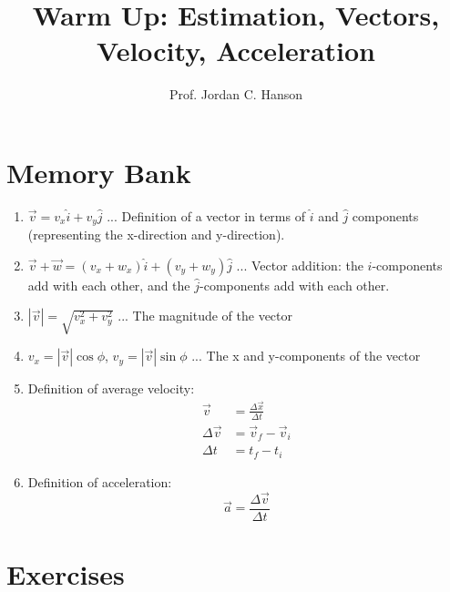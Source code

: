 \documentclass{article}
\begin{document}
\title{Warm Up: Estimation, Vectors, Velocity, Acceleration}
\author{Prof. Jordan C. Hanson}

\maketitle

\section{Memory Bank}

\begin{enumerate}
\item $\vec{v} = v_x \hat{i} + v_y \hat{j}$ ... Definition of a vector in terms of $\hat{i}$ and $\hat{j}$ components (representing the x-direction and y-direction).
\item $\vec{v} + \vec{w} = (v_x + w_x) \hat{i} + (v_y + w_y) \hat{j}$ ... Vector addition: the $\hat{i}$-components add with each other, and the $\hat{j}$-components add with each other.\
\item $|\vec{v}| = \sqrt{v_x^2 + v_y^2}$ ... The magnitude of the vector
\item $v_x = |\vec{v}| \cos\phi$, $v_y = |\vec{v}| \sin\phi$ ... The x and y-components of the vector
\item Definition of average velocity:
\begin{align}
\vec{v} &= \frac{\Delta \vec{x}}{\Delta t} \\
\Delta \vec{v} &= \vec{v}_f - \vec{v}_i \\
\Delta t &= t_f - t_i
\end{align}
\item Definition of acceleration:
\begin{equation}
\vec{a} = \frac{\Delta \vec{v}}{\Delta t}
\end{equation}
\end{enumerate}

\section{Exercises}
\end{document}

